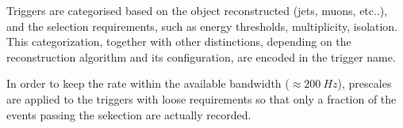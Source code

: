 Triggers are categorised based on the object reconstructed (jets, muons, etc..), 
and the selection requirements, such as energy thresholds, multiplicity, isolation.
This categorization, together with other distinctions, depending on the reconstruction algorithm
and its configuration, are encoded in the trigger name.

In order to keep the rate within the available bandwidth ($\approx{}200~Hz$), 
prescales are applied to the triggers with loose requirements so that
only a fraction of the events passing the sekection are actually recorded.
